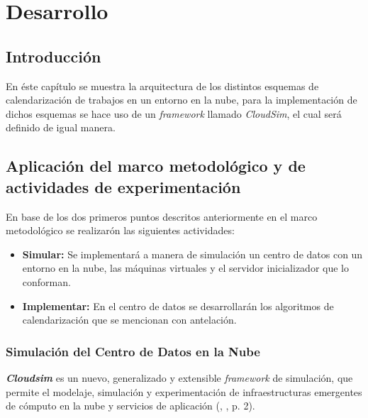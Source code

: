\chead{}
\rhead{\thepage}



\chapter{Desarrollo}
\section*{Introducci\'on}

En \'este cap\'itulo se muestra la arquitectura de los distintos esquemas de calendarizaci\'on de trabajos en un entorno en la nube, para la implementaci\'on de dichos esquemas se hace uso de un \textit{framework} llamado \textit{CloudSim}, el cual ser\'a definido de igual manera.




\newpage
{}
\section{Aplicaci\'on del marco metodol\'ogico y de actividades de experimentaci\'on}

En base de los dos primeros puntos descritos anteriormente en el marco metodol\'ogico se realizar\'on las siguientes actividades:

\begin{itemize}
	\item \textbf{Simular:} Se implementar\'a a manera de simulaci\'on un centro de datos con un entorno en la nube, las m\'aquinas virtuales y el servidor inicializador que lo conforman.
	\item \textbf{Implementar:} En el centro de datos se desarrollar\'an los algoritmos de calendarizaci\'on que se mencionan con antelaci\'on.
\end{itemize}

\subsection{Simulaci\'on del Centro de Datos en la Nube}

 \textit{\textbf{Cloudsim}} es un nuevo, generalizado y extensible \textit{framework} de simulaci\'on, que permite el modelaje, simulaci\'on y experimentaci\'on de infraestructuras emergentes de c\'omputo en la nube y servicios de aplicaci\'on (\citeauthor{calheiros2011cloudsim}, \citeyear{calheiros2011cloudsim}, p. 2).


